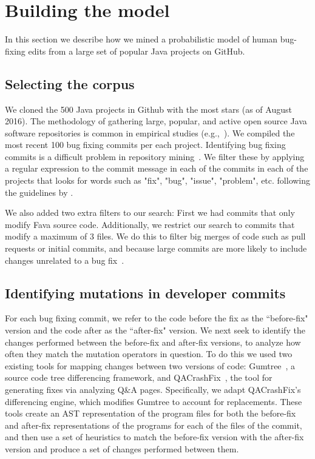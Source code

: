 \documentclass[conference]{IEEEtran}
\begin{document}
\section{Building the model} \label{buildingTheModel}

In this section we describe how we mined a probabilistic
model of human bug-fixing edits from a large set of popular Java projects on GitHub. 

\subsection{Selecting the corpus}

We cloned the 500 Java projects in Github 
with the most stars (as of August 2016). The methodology of 
gathering large,
popular, and active open source Java software repositories is common in
empirical studies (e.g.,~\cite{Ray14}). 
%
We compiled the most recent 100 bug fixing commits per each project. Identifying
bug fixing commits is a difficult
problem in repository mining~\cite{Bird09}. We filter these by applying a
regular expression to the commit message in each of the commits in each of the
projects that looks for words such as "fix", "bug", "issue", "problem",
etc. following the guidelines by \cite{schroter06,Cubranic05,Fischer03}. 

We also added two extra filters to our search: First we had commits that only 
modify Fava source code.  Additionally, we restrict our search to commits 
that modify a maximum of 3 files. We do this to
filter big merges of code such as pull requests or initial commits, and because
large commits are more likely to include changes unrelated to a bug fix~\cite{Dias15,Herzig13,Matsuda15,Kawrykow11}.

\subsection{Identifying mutations in developer commits}

For each bug fixing commit, we refer to the code before the fix as the
``before-fix" version and the code after as the ``after-fix" version.
We next seek to identify the changes performed between the before-fix and
after-fix versions, to analyze how often they match the mutation operators in
question. 
%
To do this we used two existing tools for mapping changes 
between two versions of code: Gumtree~\cite{falleri14}, a source code tree
differencing framework, and QACrashFix~\cite{gao15}, the tool for generating
fixes via analyzing Q\&A pages.  Specifically, we adapt QACrashFix's
differencing engine, which modifies Gumtree to account for replacements.
These tools create an AST representation of the program files for both the 
before-fix and after-fix representations of the programs for each of the files 
of the commit, and then use a set of heuristics to match the before-fix version 
with the after-fix version and produce a set of 
changes performed between them. 
\end{document}
